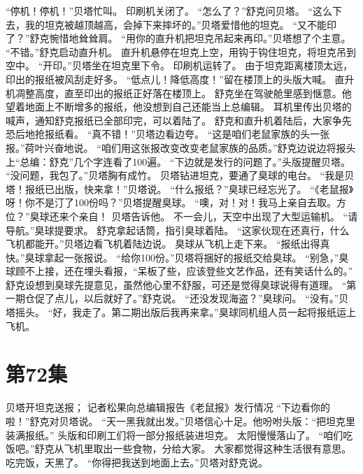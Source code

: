 \documentclass[a4paper,12pt,UTF8,twoside]{ctexbook}
\begin{document}
        “停机！停机！”贝塔忙叫。 
        印刷机关闭了。 
        “怎么了？”舒克问贝塔。 
        “这么下去，我的坦克被越顶越高，会掉下来摔坏的。”贝塔爱惜他的坦克。 
        “又不能印了？”舒克惋惜地耸耸肩。 
        “用你的直升机把坦克吊起来再印。”贝塔想了个主意。 
        “不错。”舒克启动直升机。 
        直升机悬停在坦克上空，用钩于钩住坦克，将坦克吊到空中。 
        “开印。”贝塔坐在坦克里下令。 
        印刷机运转了。 
        由于坦克距离楼顶太远，印出的报纸被风刮走好多。 
        “低点儿！降低高度！”留在楼顶上的头版大喊。 
        直升机凋整高度，直至印出的报纸正好落在楼顶上。 
        舒克坐在驾驶舱里感到惬意。他望着地面上不断增多的报纸，他没想到自己还能当上总编辑。 
        耳机里传出贝塔的喊声，通知舒克报纸已全部印完，可以着陆了。 
        舒克和直升机着陆后，大家争先恐后地抢报纸看。 
        “真不错！”贝塔边看边夸。 
        “这是咱们老鼠家族的头一张报。”荷叶兴奋地说。 
        “咱们用这张报改变改变老鼠家族的品质。”舒克边说边将报头上“总编：舒克”几个字连看了100遍。 
        “下边就是发行的问题了。”头版提醒贝塔。 
        “没问题，我包了。”贝塔胸有成竹。 
        贝塔钻进坦克，要通了臭球的电台。 
        “我是贝塔！报纸已出版，快来拿！”贝塔说。 
        “什么报纸？”臭球已经忘光了。 
        “《老鼠报》呀！你不是汀了100份吗？”贝塔提醒臭球。 
        “噢，对！对！我马上亲自去取。方位？”臭球还来个亲自！ 
        贝塔告诉他。 
        不一会儿，天空中出现了大型运输机。 
        “请导航。”臭球提要求。 
        舒克拿起话筒，指引臭球着陆。 
        “这家伙现在还真行，什么飞机都能开。”贝塔边看飞机着陆边说。 
        臭球从飞机上走下来。 
        “报纸出得真快。”臭球拿起一张报说。 
        “给你100份。”贝塔将捆好的报纸交给臭球。 
        “别急，”臭球顾不上接，还在埋头看报，“呆板了些，应该登些文艺作品，还有笑话什么的。” 
        舒克设想到臭球先提意见，虽然他心里不舒服，可还是觉得臭球说得有道理。 
        “第一期仓促了点儿，以后就好了。”舒克说。 
        “还没发现海盗？”臭球问。 
        “没有。”贝塔摇头。 
        “好，我走了。第二期出版后我再来拿。”臭球同机组人员一起将报纸运上飞机。   \chapter{第72集} 
        贝塔开坦克送报； 
        记者松果向总编辑报告《老鼠报》发行情况   
        “下边看你的啦！”舒克对贝塔说。 
        “天一黑我就出发。”贝塔信心十足。他吩咐头版：“把坦克里装满报纸。” 
        头版和印刷工们将一部分报纸装进坦克。 
        太阳慢慢落山了。 
        “咱们吃饭吧。”舒克从飞机里取出一些食物，分给大家。 
        大家都觉得这种生活很有意思。 
        吃完饭，天黑了。 
        “你得把我送到地面上去。”贝塔对舒克说。 
\end{document}
